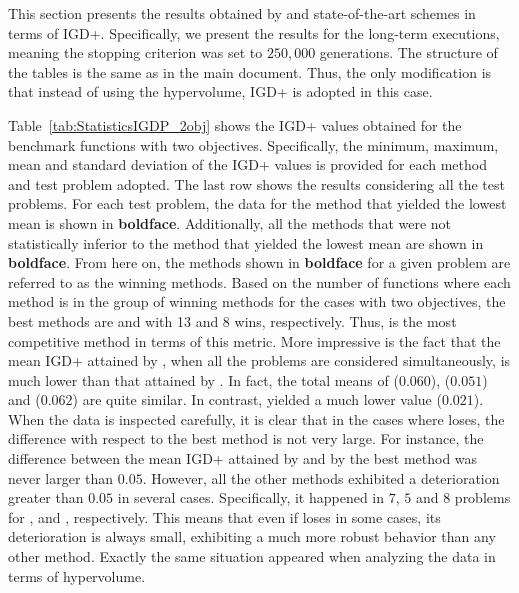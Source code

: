 



This section presents the results obtained by \VSDMOEA{} and state-of-the-art schemes in terms of
IGD+\cite{Joel:Inverted_Generational_Distance_Plus}.
%
Specifically, we present the results for the long-term executions, meaning
the stopping criterion was set to $250,000$ generations.
%
The structure of the tables is the same as in the main document.
%
Thus, the only modification is that instead of using the hypervolume, IGD+ is adopted in this case.

Table~\ref{tab:StatisticsIGDP_2obj} shows the IGD+ values obtained for the benchmark functions with two objectives.
%
Specifically, the minimum, maximum, mean and standard deviation of the IGD+ values is provided 
for each method and test problem adopted.
%
The last row shows the results considering all the test problems.
%
For each test problem, the data for the method that yielded the lowest mean is shown in {\bf boldface}.
%
Additionally, all the methods that were not statistically inferior to the method that yielded
the lowest mean are shown in {\bf boldface}.
%
From here on, the methods shown in {\bf boldface} for a given problem are referred to as the winning methods.
%
Based on the number of functions where each method is in the group of winning methods for the cases 
with two objectives, the best methods are \VSDMOEA{} and \RMOEA{} with 13 and 8 wins, respectively.
%
Thus, \VSDMOEA{} is the most competitive method in terms of this metric.
%
More impressive is the fact that the mean IGD+ attained by \VSDMOEA{}, when all the problems are considered simultaneously, is much lower 
than that attained by \RMOEA{}.
%
In fact, the total means of \RMOEA{} ($0.060$), \NSGAII{} ($0.051$) and \MOEAD{} ($0.062$) are quite similar.
%
In contrast, \VSDMOEA{} yielded a much lower value ($0.021$).
%
When the data is inspected carefully, it is clear that in the cases where \VSDMOEA{} loses, the difference with respect to the
best method is not very large.
%
For instance, the difference between the mean IGD+ attained by \VSDMOEA{} and by the best method was never larger
than $0.05$.
%
However, all the other methods exhibited a deterioration greater than $0.05$ in several cases.
%
Specifically, it happened in $7$, $5$ and $8$ problems for \MOEAD{}, \NSGAII{} and \RMOEA{}, respectively.
%
This means that even if \VSDMOEA{} loses in some cases, its deterioration is always small, exhibiting a much more 
robust behavior than any other method.
%
Exactly the same situation appeared when analyzing the data in terms of hypervolume.


